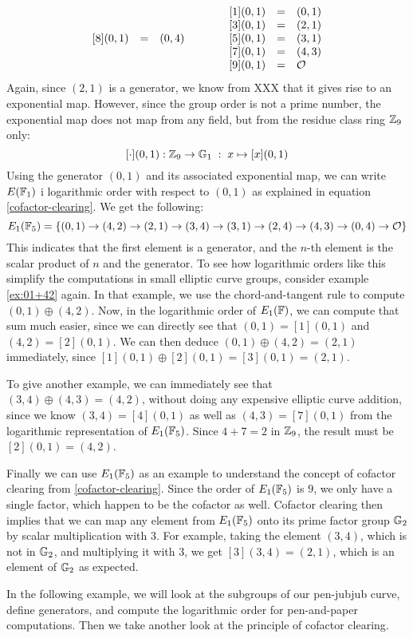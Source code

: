 \begin{example}
$$\begin{array}{lccr}
\begin{array}{lcl}
{}[8](0,1) &=& (0, 4) \\ 
\end{array} & & &
{}\begin{array}{lcl}
{}[1](0,1) &=& (0, 1) \\
{}[3](0,1) &=& (2, 1) \\
{}[5](0,1) &=& (3, 1) \\
{}[7](0,1) &=& (4, 3) \\
{}[9](0,1) &=& \mathcal{O}
\end{array}
\end{array}
$$
Again, since $(2,1)$ is a generator, we know from XXX that it gives rise to an exponential map. However, since the group order is not a prime number, the exponential map does not map from any field, but from the residue class ring $\mathbb{Z}_9$ only:
$$
[\cdot](0,1): \mathbb{Z}_9 \to \mathbb{G}_1\; : \; x\mapsto [x](0,1) 
$$
Using the generator $(0,1)$ and its associated exponential map, we can write $E(\mathbb{F}_1)$ i logarithmic order with respect to $(0,1)$ as explained in equation \ref{cofactor-clearing}. We get the following:
$$
E_1(\mathbb{F}_5) = \{(0, 1)\to (4, 2)\to (2, 1)\to (3, 4)\to (3, 1)\to (2, 4)\to (4, 3)\to (0, 4)\to \mathcal{O} \}
$$
This indicates that the first element is a generator, and the $n$-th element is the scalar product of $n$ and the generator. To see how logarithmic orders like this simplify the computations in small elliptic curve groups, consider example \ref{ex:01+42} again. In that example, we use the chord-and-tangent rule to compute $(0,1)\oplus (4,2)$. Now, in the logarithmic order of $E_1(\mathbb{F})$, we can compute that sum much easier, since we can directly see that $(0,1)=[1](0,1)$ and $(4,2)=[2](0,1)$. We can then deduce $(0,1)\oplus (4,2)= (2,1)$ immediately, since $[1](0,1)\oplus [2](0,1)= [3](0,1)=(2,1)$.

To give another example, we can immediately see that $(3,4)\oplus (4,3) = (4,2)$, without doing any expensive elliptic curve addition, since we know $(3,4)= [4](0,1)$ as well as $(4,3)= [7](0,1)$ from the logarithmic representation of $E_1(\mathbb{F}_5)$. Since $4+7 = 2$ in $\mathbb{Z}_9$, the result must be $[2](0,1)=(4,2)$.

Finally we can use $E_1(\mathbb{F}_5)$ as an example to understand the concept of cofactor clearing from \ref{cofactor-clearing}. Since the order of $E_1(\mathbb{F}_5)$ is $9$, we only have a single factor, which happen to be the cofactor as well. Cofactor clearing then implies that we can map any element from $E_1(\mathbb{F}_5)$ onto its prime factor group $\mathbb{G}_2$ by scalar multiplication with $3$. For example, taking the element $(3,4)$, which is not in $\mathbb{G}_2$, and multiplying it with $3$, we get $[3](3,4)= (2,1)$, which is an element of $\mathbb{G}_2$ as expected.
\end{example}
In the following example, we will look at the subgroups of our pen-jubjub curve, define generators, and compute the logarithmic order for pen-and-paper computations. Then we take another look at the principle of cofactor clearing.

